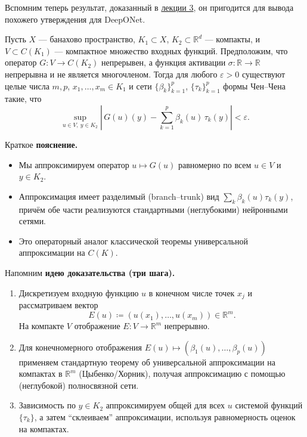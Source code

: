 \documentclass[../NDCNNAI_main.tex]{subfiles}
\begin{document}
Вспомним теперь результат, доказанный в \hyperref[thm:chen_chen_oper]{лекции 3}, он пригодится для вывода похожего утверждения для DeepONet.
\begin{theorem}
Пусть $X$ --- банахово пространство, $K_1\subset X$, $K_2\subset \mathbb{R}^d$ --- компакты,
и $V\subset C(K_1)$ --- компактное множество входных функций.
Предположим, что оператор $G\colon V\to C(K_2)$ непрерывен, а функция активации
$\sigma\colon \mathbb{R}\to\mathbb{R}$ непрерывна и не является многочленом.
Тогда для любого $\varepsilon>0$ существуют целые числа $m,p$,
$x_1,\ldots,x_m\in K_1$ и сети $\{\beta_k\}_{k=1}^{p}$, $\{\tau_k\}_{k=1}^{p}$ формы Чен--Чена такие, что
$$
\sup_{u\in V,\ y\in K_2}\left|\,G(u)(y)-\sum_{k=1}^{p}\beta_k(u)\,\tau_k(y)\right|<\varepsilon.
$$
\end{theorem}

Краткое \textbf{пояснение.}
\begin{itemize}
  \item Мы аппроксимируем оператор $u\mapsto G(u)$ равномерно по всем $u\in V$ и $y\in K_2$.
  \item Аппроксимация имеет разделимый (branch--trunk) вид $\sum_k \beta_k(u)\tau_k(y)$,
  причём обе части реализуются стандартными (неглубокими) нейронными сетями.
  \item Это операторный аналог классической теоремы универсальной аппроксимации на $C(K)$.
\end{itemize}
Напомним \textbf{идею доказательства (три шага).}
\begin{enumerate}
  \item Дискретизуем входную функцию $u$ в конечном числе точек $x_j$ и рассматриваем вектор
  \[
    E(u)\coloneq (u(x_1),\ldots,u(x_m))\in\mathbb{R}^m.
  \]
  На компакте $V$ отображение $E\colon V\to\mathbb{R}^m$ непрерывно.

  \item Для конечномерного отображения $E(u)\mapsto (\beta_1(u),\ldots,\beta_p(u))$ применяем стандартную теорему
  об универсальной аппроксимации на компактах в $\mathbb{R}^m$ (Цыбенко/Хорник), получая аппроксимацию
  с помощью (неглубокой) полносвязной сети.

  \item Зависимость по $y\in K_2$ аппроксимируем общей для всех $u$ системой функций $\{\tau_k\}$,
  а затем ``склеиваем'' аппроксимации, используя равномерность оценок на компактах.
\end{enumerate}
\end{document}
